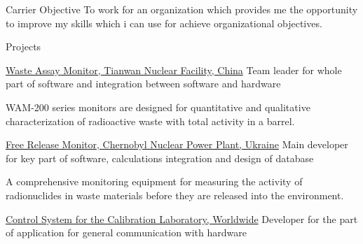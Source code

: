\documentclass{cv} %
\begin{document}
\begin{rSection}{Carrier Objective}
 To work for an organization which provides me the opportunity to improve my skills which i can use for achieve organizational objectives.
\end{rSection}
\begin{rSection}{Projects}
\begin{rSubsection}
{\href{https://www.vfnuclear.com/en/products/waste-assay-monitor}{Waste Assay Monitor, Tianwan Nuclear Facility, China}}{}
{Team leader for whole part of software and integration between software and hardware}{}

WAM-200 series monitors are designed for quantitative and qualitative characterization of radioactive waste with total activity in a barrel.
\end{rSubsection}

\begin{rSubsection}
{\href{https://www.vfnuclear.com/en/free-release-monitor-frm-03-delivery-for-chernobyl-npp}{Free Release Monitor, Chernobyl Nuclear Power Plant, Ukraine}}{}
{Main developer for key part of software, calculations integration and design of database}{}

A comprehensive monitoring equipment for measuring the activity of radionuclides in waste materials before they are released into the environment.
\end{rSubsection}



\begin{rSubsection}
{\href{https://www.vf.cz/en/products/dars-control-system-for-the-calibration-laboratory-dars}{Control System for the Calibration Laboratory, Worldwide}}{}
{Developer for the part of application for general communication with hardware}{}


\end{rSubsection}
\end{rSection}
\end{document}
